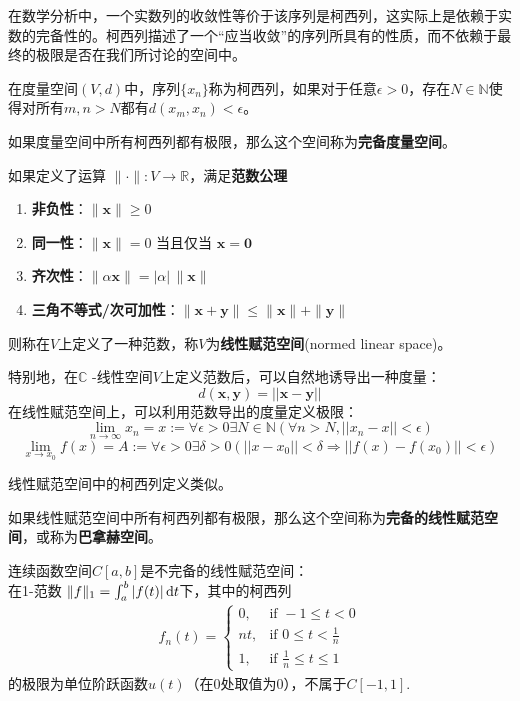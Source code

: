 \documentclass{ctexbook}
\begin{document}
在数学分析中，一个实数列的收敛性等价于该序列是柯西列，这实际上是依赖于实数的完备性的。柯西列描述了一个“应当收敛”的序列所具有的性质，而不依赖于最终的极限是否在我们所讨论的空间中。
\begin{definition}[柯西列]
    在度量空间$(V,d)$中，序列$\{x_n\}$称为柯西列，如果对于任意$\epsilon>0$，存在$N\in\mathbb{N}$使得对所有$m,n>N$都有$d(x_m,x_n)<\epsilon$。
\end{definition}

\begin{definition}[完备度量空间]
    如果度量空间中所有柯西列都有极限，那么这个空间称为\textbf{完备度量空间}。
\end{definition}

\begin{definition}[范数]
    如果定义了运算
$\|\cdot \| :V\rightarrow \mathbb{R} $，满足\textbf{范数公理}
\begin{enumerate}
    \item \textbf{非负性}：$\|\mathbf{x}\| \geq 0$
    \item \textbf{同一性}：$\|\mathbf{x}\| = 0$ 当且仅当 $\mathbf{x} = \mathbf{0}$
    \item \textbf{齐次性}：$\|\alpha \mathbf{x}\| = |\alpha| \, \|\mathbf{x}\|$
    \item \textbf{三角不等式/次可加性}：$\|\mathbf{x} + \mathbf{y}\| \leq \|\mathbf{x}\| + \|\mathbf{y}\|$
\end{enumerate}
则称在$V$上定义了一种范数，称$V$为\textbf{线性赋范空间}(normed linear space)。
\end{definition}
特别地，在$\mathbb{C}$ -线性空间$V$上定义范数后，可以自然地诱导出一种度量：
$$d(\mathbf x,\mathbf y)=||\mathbf x-\mathbf y||$$
在线性赋范空间上，可以利用范数导出的度量定义极限：
\[\lim_{n\to\infty}x_n=x:=\forall \epsilon>0\exists N\in\mathbb{N}(\forall n>N,||x_n-x||<\epsilon)\]
\[\lim_{x \to x_0} f(x)=A:=\forall \epsilon>0\exists \delta>0(||x-x_0||<\delta\Rightarrow ||f(x)-f(x_0)||<\epsilon) \]

线性赋范空间中的柯西列定义类似。

\begin{definition}[完备的线性赋范空间]
    如果线性赋范空间中所有柯西列都有极限，那么这个空间称为\textbf{完备的线性赋范空间}，或称为\textbf{巴拿赫空间}\cite{real_analysis}。
\end{definition}

\begin{example}
    连续函数空间$C[a,b]$是不完备的线性赋范空间：\\
    在1-范数
$\|f\|_1 =\int_{a}^{b}|f(t)|\,\text dt$下，其中的柯西列\begin{align*}
    f_n(t)=\begin{cases}
        0,&\text{if }-1\leq t <0\\
        nt,&\text{if }0\leq t <\frac{1}{n}\\
        1,&\text{if }\frac{1}{n}\leq t \leq 1
    \end{cases}
\end{align*}
的极限为单位阶跃函数$u(t)$（在0处取值为0），不属于$C[-1,1]$.
\end{example}
\end{document}
